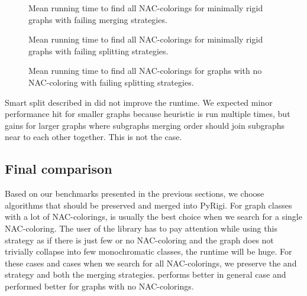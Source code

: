 \begin{figure}[p]
	\centering
	\scalebox{0.5}{}
	\caption[Mean runtime for minimally rigid graphs (some) (with failing).]{
		Mean running time to find all NAC-colorings for minimally rigid graphs with failing merging strategies.}%
	\label{fig:graph_mimimally_rigid_failing_merging_first_runtime}
\end{figure}%
\begin{figure}[p]
	\centering
	\scalebox{0.5}{}
	\caption[Mean runtime for minimally rigid graphs (some) (with failing).]{
		Mean running time to find all NAC-colorings for minimally rigid graphs with failing splitting strategies.}%
	\label{fig:graph_mimimally_rigid_failing_split_first_runtime}
\end{figure}%
\begin{figure}[p]
	\centering
	\scalebox{0.5}{}
	\caption[Mean runtime for graphs with no NAC-coloring (with failing).]{
		Mean running time to find all NAC-colorings for graphs with no NAC-coloring with failing splitting strategies.}%
	\label{fig:graph_no_nac_coloring_generated_rigid_failing_merging_first_runtime}
\end{figure}%

Smart split described in 
did not improve the runtime.
We expected minor performance hit for smaller graphs because heuristic is run
multiple times, but gains for larger graphs where subgraphs merging order
should join subgraphs near to each other together. This is not the case.

\subsection{Final comparison}

Based on our benchmarks presented in the previous sections,
we choose algorithms that should be preserved and merged into PyRigi.
For graph classes with a lot of NAC-colorings,
\NaiveCycles{} is usually the best choice
when we search for a single NAC-coloring.
%
The user of the library has to pay attention while using this strategy
as if there is just few or no NAC-coloring and the graph does not trivially collapse
into few monochromatic classes, the runtime will be huge.
%
For these cases and cases when we search for all NAC-colorings,
we preserve the \Neighbors{} and \NeighborsDegree{} strategy and both the merging strategies.
\MergeLinear{} performs better in general case and
\SharedVertices{} performed better for graphs with no NAC-colorings.


